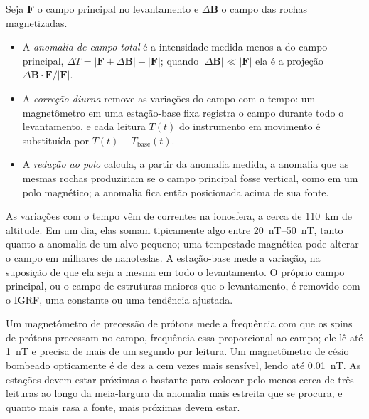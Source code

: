 \begin{definition}\label{def:b3:field-lab-methods-3:magnetic}
Seja $\mathbf{F}$ o campo principal no levantamento e $\Delta\mathbf{B}$
o campo das rochas magnetizadas.
\begin{itemize}
  \item A \emph{anomalia de campo total} é
        a intensidade medida menos a do campo principal, $\Delta T =
        |\mathbf{F} + \Delta\mathbf{B}| - |\mathbf{F}|$; quando
        $|\Delta\mathbf{B}| \ll |\mathbf{F}|$ ela é a projeção
        $\Delta\mathbf{B}\cdot\mathbf{F}/|\mathbf{F}|$.
  \item A \emph{correção diurna} remove
        as variações do campo com o tempo: um magnetômetro em uma
        estação-base fixa registra o campo durante todo o levantamento, e cada
        leitura $T(t)$ do instrumento em movimento é substituída por $T(t) -
        T_\mathrm{base}(t)$.
  \item A \emph{redução ao polo}
        calcula, a partir da anomalia medida, a anomalia que as mesmas rochas
        produziriam se o campo principal fosse vertical, como em um
        polo magnético; a anomalia fica então posicionada acima de sua fonte.
\end{itemize}
\end{definition}

As variações com o tempo vêm de correntes na ionosfera, a cerca de
\qty{110}{km} de altitude. Em um dia, elas somam tipicamente algo entre
\qtyrange{20}{50}{nT}, tanto quanto a anomalia de um alvo pequeno; uma
tempestade magnética pode alterar o campo em milhares de nanoteslas. A
estação-base mede a variação, na suposição de que ela seja a
mesma em todo o levantamento. O próprio campo principal, ou o campo de
estruturas maiores que o levantamento, é removido com o IGRF, uma constante
ou uma tendência ajustada.

Um magnetômetro de precessão de prótons mede a frequência com que os spins de prótons
precessam no campo, frequência essa proporcional ao campo; ele
lê até \qty{1}{nT} e precisa de mais de um segundo por leitura. Um
magnetômetro de césio bombeado opticamente é de dez a cem vezes mais
sensível, lendo até \qty{0.01}{nT}. As estações devem estar próximas o bastante
para colocar pelo menos cerca de três leituras ao longo da meia-largura da
anomalia mais estreita que se procura, e quanto mais rasa a fonte, mais próximas
devem estar.

